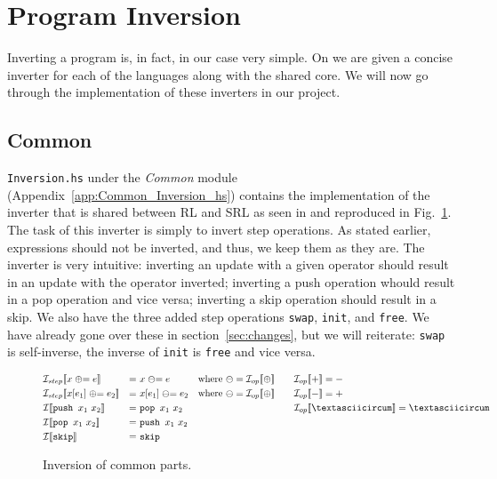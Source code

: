 \section{Program Inversion}

Inverting a program is, in fact, in our case very simple. On \cite[p.~104]{REV} we are given a concise inverter for each of the languages along with the shared core. We will now go through the implementation of these inverters in our project.

\subsection{Common}
\label{sec:invcommon}

\texttt{Inversion.hs} under the \textit{Common} module (Appendix~\ref{app:Common_Inversion_hs}) contains the implementation of the inverter that is shared between RL and SRL as seen in \cite[Fig.~20]{REV} and reproduced in Fig.~\ref{fig:inversion_common}. The task of this inverter is simply to invert step operations. As stated earlier, expressions should not be inverted, and thus, we keep them as they are. The inverter is very intuitive: inverting an update with a given operator should result in an update with the operator inverted; inverting a push operation whould result in a pop operation and vice versa; inverting a skip operation should result in a skip. We also have the three added step operations \texttt{swap}, \texttt{init}, and \texttt{free}. We have already gone over these in section~\ref{sec:changes}, but we will reiterate: \texttt{swap} is self-inverse, the inverse of \texttt{init} is \texttt{free} and vice versa.
\begin{figure}
  $$\begin{aligned}
    & \mathcal{I}_{step}\llbracket x \mathrel{\oplus}= e\rrbracket & =\ & x \mathrel{\ominus}= e & & \text{where }\ominus = \mathcal{I}_{op}\llbracket\oplus\rrbracket & \quad & \mathcal{I}_{op}\llbracket +\rrbracket = -\\
    & \mathcal{I}_{step}\llbracket x[e_1] \mathrel{\oplus}= e_2\rrbracket & =\ & x[e_1] \mathrel{\ominus}= e_2 & & \text{where }\ominus = \mathcal{I}_{op}\llbracket\oplus\rrbracket & \quad & \mathcal{I}_{op}\llbracket -\rrbracket = +\\
    & \mathcal{I}\llbracket\texttt{push }x_1\ x_2\rrbracket & =\ & \texttt{pop }x_1\ x_2 & & & \quad & \mathcal{I}_{op}\llbracket \mathrm{\textasciicircum}\rrbracket = \mathrm{\textasciicircum}\\
    & \mathcal{I}\llbracket\texttt{pop }x_1\ x_2\rrbracket & =\ & \texttt{push }x_1\ x_2\\
    & \mathcal{I}\llbracket\texttt{skip}\rrbracket & =\ & \texttt{skip}\\
  \end{aligned}$$
  \caption{Inversion of common parts.}
  \label{fig:inversion_common}
\end{figure}

